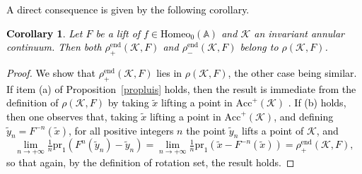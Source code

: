 \documentclass[12pt,a4paper]{amsart}
\newtheorem{cor}[thm]{Corollary}
\theoremstyle{definition}
\theoremstyle{remark}
\newcommand{\homeo}{\mathrm{Homeo}_0(\A)}
\newcommand{\A}{\mathbb{A}}
\begin{document}
\textcolor{black}{A direct consequence is given by the following corollary. 
\begin{cor}
Let $F$ be a lift of $f\in\homeo$ and $\mathcal{K}$ an invariant annular continuum. Then both $\rho^{\mathrm{end}}_+(\mathcal{K},F)$ and $\rho^{\mathrm{end}}_-(\mathcal{K},F)$ belong to $\rho(\mathcal{K},F)$. 
\end{cor} 
\begin{proof}
We show that $\rho^{\mathrm{end}}_+(\mathcal{K},F)$ lies in $\rho(\mathcal{K},F)$, the other case being similar. If item (a) of Proposition~\ref{propluis} holds, then the result is immediate from the definition of $\rho(\mathcal{K},F)$ by taking $\tilde{x}$ lifting a point in $\mathrm{Acc}^+(\mathcal{K})$ . If (b) holds, then one observes that, taking $\tilde{x}$ lifting a point in $\mathrm{Acc}^+(\mathcal{K})$, and defining $\tilde{y}_n=F^{-n}(\tilde{x})$, for all positive integers $n$ the point $\tilde{y}_n$ lifts a point of $\mathcal{K}$, and 
$$\lim_{n\to+\infty}\tfrac{1}{n}\mathrm{pr}_1\left(F^{n}(\widetilde y_n)-\widetilde y_n\right)=\lim_{n\to+\infty}\tfrac{1}{n}\mathrm{pr}_1\left(\widetilde x-F^{-n}(\widetilde x)\right)=\rho^{\mathrm{end}}_+(\mathcal{K},F),$$
so that again, by the definition of rotation set, the result holds. 
\end{proof}
}
\end{document}
